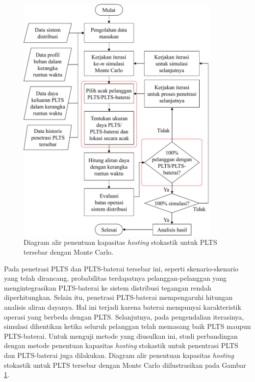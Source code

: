 {\begin{figure}[!t]
	\centering
	\includegraphics[width=0.9\textwidth]{Fig/fcmcbatt}
	\caption{Diagram alir penentuan kapasitas \textit{\textit{hosting}} stokastik untuk PLTS tersebar dengan Monte Carlo.}
	\label{fcmcbatt}
\end{figure}
Pada penetrasi PLTS dan PLTS-baterai tersebar ini, seperti skenario-skenario yang telah dirancang, probabilitas terdapatnya pelanggan-pelanggan yang mengintegrasikan PLTS-baterai ke sistem distribusi tegangan rendah diperhitungkan. Selain itu, penetrasi PLTS-baterai mempengaruhi hitungan analisis aliran dayanya. Hal ini terjadi karena baterai mempunyai karakteristik operasi yang berbeda dengan PLTS. Selanjutnya, pada pengendalian iterasinya, simulasi dihentikan ketika seluruh pelanggan telah memasang baik PLTS maupun PLTS-baterai. Untuk menguji metode yang diusulkan ini, studi perbandingan dengan metode penentuan kapasitas \textit{\textit{hosting}} stokastik untuk penentrasi PLTS dan PLTS-baterai juga dilakukan. Diagram alir penentuan kapasitas \textit{\textit{hosting}} stokastik untuk PLTS tersebar dengan Monte Carlo diilustrasikan pada Gambar \ref{fcmcbatt}.


}
